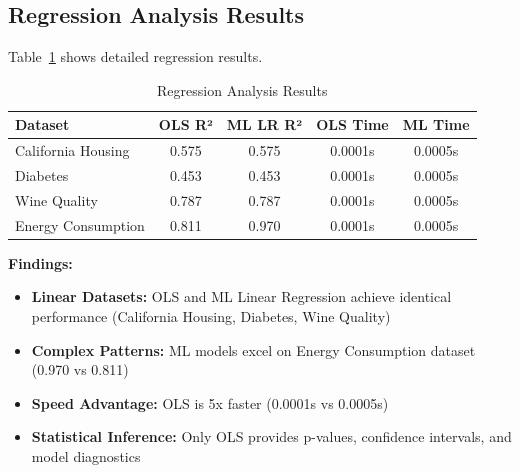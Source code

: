 \documentclass[11pt,a4paper]{article}
\begin{document}

\subsection{Regression Analysis Results}

Table~\ref{tab:regression_results} shows detailed regression results.

\begin{table}[h]
\centering
\begin{tabular}{lcccc}
\toprule
\textbf{Dataset} & \textbf{OLS R²} & \textbf{ML LR R²} & \textbf{OLS Time} & \textbf{ML Time} \\
\midrule
California Housing & 0.575 & 0.575 & 0.0001s & 0.0005s \\
Diabetes & 0.453 & 0.453 & 0.0001s & 0.0005s \\
Wine Quality & 0.787 & 0.787 & 0.0001s & 0.0005s \\
Energy Consumption & 0.811 & \textcolor{mlcolor}{0.970} & 0.0001s & 0.0005s \\
\bottomrule
\end{tabular}
\caption{Regression Analysis Results}
\label{tab:regression_results}
\end{table}

\textbf{Findings:}
\begin{itemize}
    \item \textbf{Linear Datasets:} OLS and ML Linear Regression achieve identical performance (California Housing, Diabetes, Wine Quality)
    \item \textbf{Complex Patterns:} ML models excel on Energy Consumption dataset (0.970 vs 0.811)
    \item \textbf{Speed Advantage:} OLS is 5x faster (0.0001s vs 0.0005s)
    \item \textbf{Statistical Inference:} Only OLS provides p-values, confidence intervals, and model diagnostics
\end{itemize}
\end{document}
